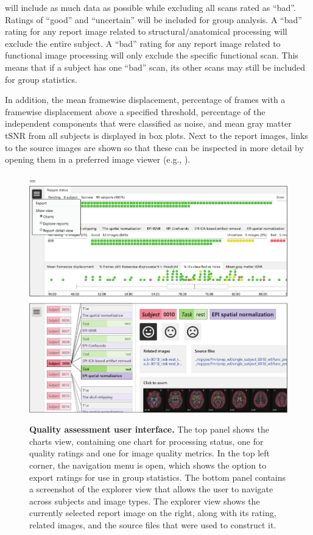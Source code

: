 will include as much data as possible while excluding all
scans rated as ``bad''. Ratings of ``good'' and ``uncertain'' will be
included for group analysis. A ``bad'' rating for any report image related
to structural/anatomical processing will exclude the entire subject. A 
``bad'' rating for any report image related to functional image processing
will only exclude the specific functional scan. This means that if a
subject has one ``bad'' scan, its other scans may still be included for
group statistics.

In addition, the mean framewise displacement, percentage of frames with a
framewise displacement above a specified threshold, percentage of the
independent components that were classified as noise, and mean gray matter
tSNR from all subjects is displayed in box plots. Next to the report
images, links to the source images are shown so that these can be inspected
in more detail by opening them in a preferred image viewer (e.g.,
).

\begin{figure}[!tb]
\begin{adjustwidth}{-1cm}{}
\hsize=\linewidth%
\includegraphics[width=\linewidth]{fig/quality_assessment-crop}
\caption{\textbf{Quality assessment user interface.} The top panel shows
the charts view, containing one chart for processing status, one for
quality ratings and one for image quality metrics. In the top left
corner, the navigation menu is open, which shows the option to export
ratings for use in group statistics. The bottom panel contains a 
screenshot of the explorer view that allows the user to navigate across
subjects and image types. The explorer view shows the currently selected
report image on the right, along with its rating, related images, and the
source files that were used to construct it.}\label{fig:qa}
\end{adjustwidth}
\end{figure}

